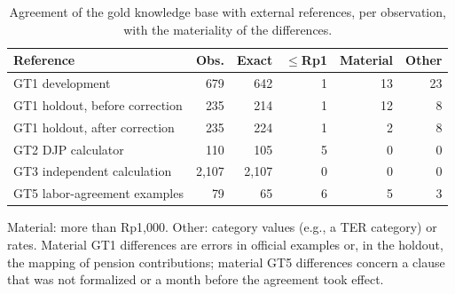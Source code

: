 \begin{table}[!h]
\caption{Agreement of the gold knowledge base with external references, per observation, with the materiality of the differences.}
\label{tab:refs}
\centering\footnotesize
\setlength{\tabcolsep}{2.5pt}
\begin{tabularx}{\columnwidth}{@{}Lrrrrr@{}}
\toprule
Reference & Obs. & Exact & $\leq$Rp1 & Material & Other \\
\midrule
GT1 development & 679 & 642 & 1 & 13 & 23 \\
GT1 holdout, before correction & 235 & 214 & 1 & 12 & 8 \\
GT1 holdout, after correction & 235 & 224 & 1 & 2 & 8 \\
GT2 DJP calculator & 110 & 105 & 5 & 0 & 0 \\
GT3 independent calculation & 2,107 & 2,107 & 0 & 0 & 0 \\
GT5 labor-agreement examples & 79 & 65 & 6 & 5 & 3 \\
\bottomrule
\end{tabularx}
\begin{minipage}{\columnwidth}\vspace{2pt}\scriptsize
Material: more than Rp1,000. Other: category values (e.g., a TER category) or rates. Material GT1 differences are errors in official examples or, in the holdout, the mapping of pension contributions; material GT5 differences concern a clause that was not formalized or a month before the agreement took effect.
\end{minipage}
\end{table}

